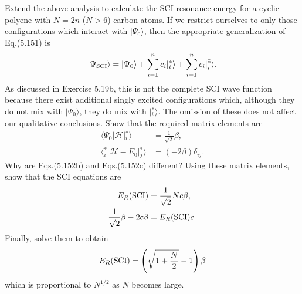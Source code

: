\documentclass[a4paper]{book}
\newcounter{exercise}[chapter]
\begin{document}
	\begin{exercise}
	Extend the above analysis to calculate the SCI resonance energy for a cyclic polyene with $N=2n$ ($N>6$) carbon atoms. If we restrict ourselves to only those configurations which interact with $| \Psi_0 \rangle$, then the appropriate generalization of Eq.(5.151) is
	\[
		| \Psi_{\rm SCI} \rangle = | \Psi_0 \rangle + \sum_{i=1}^n c_i | {}^*_i \rangle + \sum_{i=1}^n \bar{c}_i | {}^{\bar{*}}_{\bar{i}}\rangle.
	\]
	As discussed in Exercise 5.19b, this is not the complete SCI wave function because there exist additional singly excited configurations which, although they do not mix with $|\Psi_0\rangle$, they do mix with $| {}^*_i \rangle$. The omission of these does not affect our qualitative conclusions. Show that the required matrix elements are
	\begin{align*}
		\langle \Psi_0 | \mathscr{H} | {}^*_i \rangle &= \frac{1}{\sqrt{2}} \beta, \\
		\langle {}^*_i | \mathscr{H} - E_0 | {}^*_j \rangle &= (-2\beta) \delta_{ij}.
	\end{align*}
	Why are Eqs.(5.152b) and Eqs.(5.152c) different? Using these matrix elements, show that the SCI equations are
	\begin{align*}
		E_R ({\rm SCI}) &= \frac{1}{\sqrt{2}} Nc \beta , \\
		\frac{1}{\sqrt{2}} \beta - 2c \beta &= E_R( {\rm SCI} )c.
	\end{align*}
	Finally, solve them to obtain
	\[
		E_R ({\rm SCI}) = \left( \sqrt{ 1 + \frac{N}{2} } - 1 \right) \beta
	\]
	which is proportional to $N^{1/2}$ as $N$ becomes large.
	\end{exercise}
	
\end{document}
